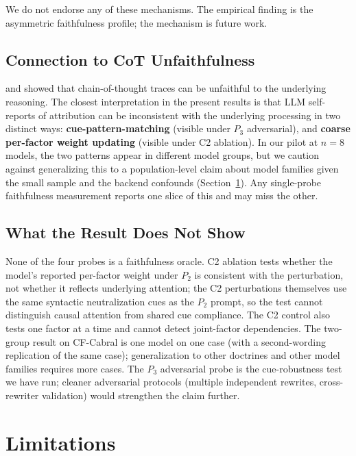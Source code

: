 \documentclass[11pt]{article}
\begin{document}
We do not endorse any of these mechanisms. The empirical finding is the asymmetric faithfulness profile; the mechanism is future work.

\subsection{Connection to CoT Unfaithfulness}

\citet{turpin2023} and \citet{lanham2023} showed that chain-of-thought traces can be unfaithful to the underlying reasoning. The closest interpretation in the present results is that LLM self-reports of attribution can be inconsistent with the underlying processing in two distinct ways: \textbf{cue-pattern-matching} (visible under $P_3$ adversarial), and \textbf{coarse per-factor weight updating} (visible under C2 ablation). In our pilot at $n = 8$ models, the two patterns appear in different model groups, but we caution against generalizing this to a population-level claim about model families given the small sample and the backend confounds (Section~\ref{sec:limitations}). Any single-probe faithfulness measurement reports one slice of this and may miss the other.

\subsection{What the Result Does Not Show}

None of the four probes is a faithfulness oracle. C2 ablation tests whether the model's reported per-factor weight under $P_2$ is consistent with the perturbation, not whether it reflects underlying attention; the C2 perturbations themselves use the same syntactic neutralization cues as the $P_2$ prompt, so the test cannot distinguish causal attention from shared cue compliance. The C2 control also tests one factor at a time and cannot detect joint-factor dependencies. The two-group result on CF-Cabral is one model on one case (with a second-wording replication of the same case); generalization to other doctrines and other model families requires more cases. The $P_3$ adversarial probe is the cue-robustness test we have run; cleaner adversarial protocols (multiple independent rewrites, cross-rewriter validation) would strengthen the claim further.

\section{Limitations}
\label{sec:limitations}
\end{document}
